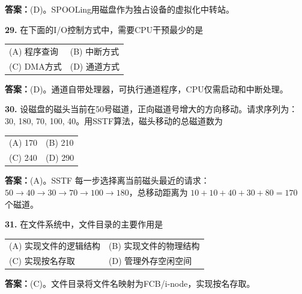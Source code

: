 \ifshowsolutions\par\noindent\textbf{答案：}(D)。SPOOLing用磁盘作为独占设备的虚拟化中转站。\else \answerarea \fi

\vspace{6pt}

\noindent\textbf{29.} 在下面的I/O控制方式中，需要CPU干预最少的是
\begin{center}
\begin{tabular}{ll}
(A) 程序查询 & (B) 中断方式 \\[6pt]
(C) DMA方式 & (D) 通道方式
\end{tabular}
\end{center}

\ifshowsolutions\par\noindent\textbf{答案：}(D)。通道自带处理器，可执行通道程序，CPU仅需启动和中断处理。\else \answerarea \fi

\vspace{6pt}

\noindent\textbf{30.} 设磁盘的磁头当前在50号磁道，正向磁道号增大的方向移动。请求序列为：30, 180, 70, 100, 40。用SSTF算法，磁头移动的总磁道数为
\begin{center}
\begin{tabular}{ll}
(A) 170 & (B) 210 \\[6pt]
(C) 240 & (D) 290
\end{tabular}
\end{center}

\ifshowsolutions\par\noindent\textbf{答案：}(A)。SSTF 每一步选择离当前磁头最近的请求：
$50\to40\to30\to70\to100\to180$，总移动距离为
$10+10+40+30+80=170$ 个磁道。\else \answerarea \fi

\vspace{6pt}

\noindent\textbf{31.} 在文件系统中，文件目录的主要作用是
\begin{center}
\begin{tabular}{ll}
(A) 实现文件的逻辑结构 & (B) 实现文件的物理结构 \\[6pt]
(C) 实现按名存取 & (D) 管理外存空闲空间
\end{tabular}
\end{center}

\ifshowsolutions\par\noindent\textbf{答案：}(C)。文件目录将文件名映射为FCB/i-node，实现按名存取。\else \answerarea \fi

\vspace{6pt}

